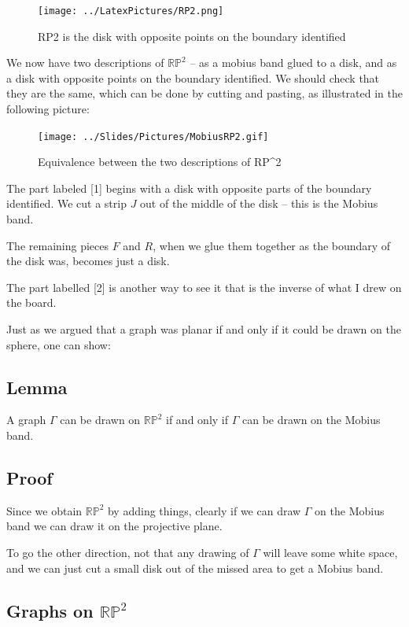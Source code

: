 \documentclass[]{article}
\begin{document}
\begin{figure}[htbp]
\centering
\texttt{[image: ../LatexPictures/RP2.png]}
\caption{RP2 is the disk with opposite points on the boundary
identified}
\end{figure}

We now have two descriptions of \(\mathbb{RP}^2\) -- as a mobius band
glued to a disk, and as a disk with opposite points on the boundary
identified. We should check that they are the same, which can be done by
cutting and pasting, as illustrated in the following picture:

\begin{figure}[htbp]
\centering
\texttt{[image: ../Slides/Pictures/MobiusRP2.gif]}
\caption{Equivalence between the two descriptions of RP\^{}2}
\end{figure}

The part labeled {[}1{]} begins with a disk with opposite parts of the
boundary identified. We cut a strip \(J\) out of the middle of the disk
-- this is the Mobius band.

The remaining pieces \(F\) and \(R\), when we glue them together as the
boundary of the disk was, becomes just a disk.

The part labelled {[}2{]} is another way to see it that is the inverse
of what I drew on the board.

Just as we argued that a graph was planar if and only if it could be
drawn on the sphere, one can show:

\subsection{Lemma}\label{lemma-7}

A graph \(\Gamma\) can be drawn on \(\mathbb{RP}^2\) if and only if
\(\Gamma\) can be drawn on the Mobius band.

\subsection{Proof}\label{proof-12}

Since we obtain \(\mathbb{RP}^2\) by adding things, clearly if we can
draw \(\Gamma\) on the Mobius band we can draw it on the projective
plane.

To go the other direction, not that any drawing of \(\Gamma\) will leave
some white space, and we can just cut a small disk out of the missed
area to get a Mobius band.

\subsection{\texorpdfstring{Graphs on
\(\mathbb{RP}^2\)}{Graphs on \textbackslash{}mathbb\{RP\}\^{}2}}\label{graphs-on-mathbbrp2}
\end{document}

